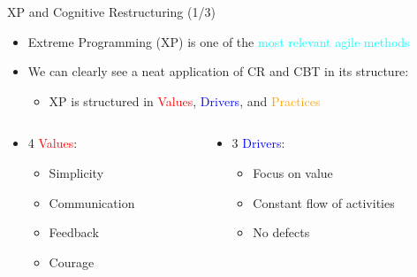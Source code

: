 \documentclass{beamer}
\begin{document}
\begin{frame}{\centerline{XP and Cognitive Restructuring (1/3)}}

\begin{itemize}
\item  Extreme Programming (XP) is one of the \textcolor{cyan}{most relevant agile methods}
\item  We can clearly see a neat application of CR and CBT in its structure:
\begin{itemize}
\item XP is structured in \textcolor{red}{Values}, \textcolor{blue}{Drivers}, and \textcolor{orange}{Practices}
\end{itemize}
\end{itemize}


\begin{columns}
\begin{column}{0.5\textwidth}
\begin{itemize}
\item 4 \textcolor{red}{Values}:
\begin{itemize}
\item  Simplicity
\item Communication
\item Feedback
\item Courage
\end{itemize}
\end{itemize}

\end{column}

\begin{column}{0.5\textwidth} 
\begin{itemize}
\item 3 \textcolor{blue}{Drivers}:
\begin{itemize}
\item  Focus on value
\item  Constant flow of activities
\item  No defects
\end{itemize}
\end{itemize}

\end{column}

\end{columns}


\end{frame}
\end{document}
